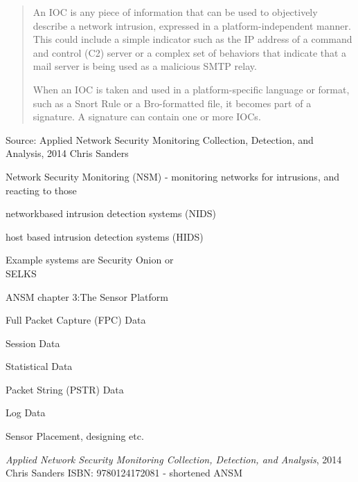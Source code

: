 \documentclass[Screen16to9,17pt]{foils}
\begin{document}

\begin{quote}
An IOC is any piece of information that can be used to objectively describe a
network intrusion, expressed in a platform-independent manner. This could include a simple indicator such as the IP address of a command and control (C2) server or a complex set of behaviors that indicate that a mail server is being used as a malicious SMTP relay.

When an IOC is taken and used in a platform-specific language or format, such as a Snort Rule or a Bro-formatted file, it becomes part of a signature. A signature can contain one or more IOCs.
\end{quote}

Source: Applied Network Security Monitoring Collection, Detection, and Analysis, 2014 Chris Sanders


\begin{list2}
\item Network Security Monitoring (NSM) - monitoring networks for intrusions, and reacting to those
\item networkbased intrusion detection systems (NIDS)
\item host based intrusion detection systems (HIDS)
\item Example systems are Security Onion  or\\ SELKS 
\end{list2}





\begin{list1}
\item ANSM chapter 3:The Sensor Platform
\begin{list2}
\item Full Packet Capture (FPC) Data
\item Session Data
\item Statistical Data
\item Packet String (PSTR) Data
\item Log Data
\item Sensor Placement, designing etc.
\end{list2}
\end{list1}
\emph{Applied Network Security Monitoring Collection, Detection, and Analysis}, 2014 Chris Sanders ISBN: 9780124172081 - shortened ANSM
\end{document}
